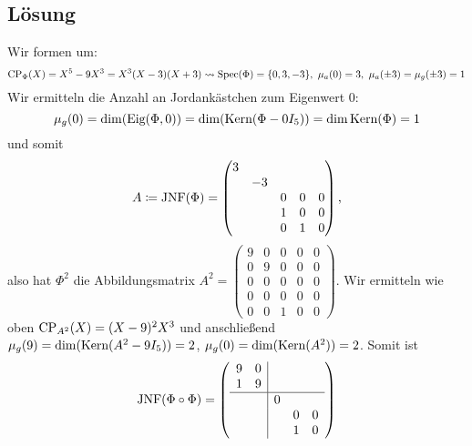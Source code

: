 \subsection{Lösung}
Wir formen um:
\begin{equation*}
	\cp_\Phi(X) = X^5-9X^3 = X^3(X-3)(X+3) \leadsto \spec(\Phi) = \{ 0, 3, -3 \}, \ \mu_a(0)=3, \ \mu_a(\pm 3) = \mu_g(\pm 3) = 1
\end{equation*}
Wir ermitteln die Anzahl an Jordankästchen zum Eigenwert \( 0 \):
\begin{equation*}
	\mu_g(0) = \dim(\text{Eig}(\Phi,0)) = \dim(\text{Kern}(\Phi-0I_5)) = \dim\text{Kern}(\Phi) = 1
\end{equation*}
und somit
\begin{equation*}
	A \coloneqq \text{JNF}(\Phi) = \begin{pmatrix}
		3 & & & &  \\
		 & -3 & & &  \\
		 & & 0 & 0 & 0 \\
		 & & 1 & 0 & 0 \\
		 & & 0 & 1 & 0 
	\end{pmatrix}\text{,}
\end{equation*}
also hat \( \Phi^2 \) die Abbildungsmatrix \( A^2 = \left( \begin{smallmatrix}
	9 & 0 & 0 & 0 & 0 \\
	0 & 9 & 0 & 0 & 0 \\
	0 & 0 & 0 & 0 & 0 \\
	0 & 0 & 0 & 0 & 0 \\
	0 & 0 & 1 & 0 & 0 
\end{smallmatrix} \right) \). Wir ermitteln wie oben \( \text{CP}_{A^2}(X) = (X-9)^2X^3 \) und anschließend \( \mu_g(9) = \dim(\text{Kern}(A^2-9I_5))=2 \), \( \mu_g(0) = \dim(\text{Kern}(A^2)) = 2 \). Somit ist
\begin{equation*}
	\text{JNF}(\Phi \circ \Phi) = \left( \begin{array}{cc|ccc}
		9 & 0 &   &   &   \\
		1 & 9 &   &   &   \\
		\hline
		  &   & 0 &   &   \\
		  &   &   & 0 & 0 \\
		  &   &   & 1 & 0 
	\end{array} \right)
\end{equation*}